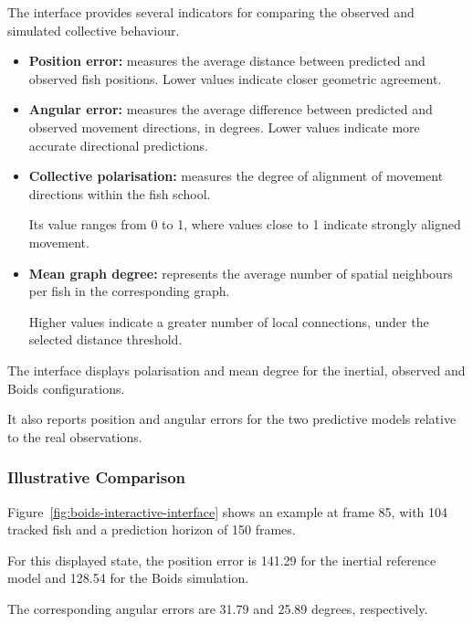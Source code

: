 \documentclass[10pt,a4paper]{article}
\begin{document}
The interface provides several indicators
for comparing the observed and simulated
collective behaviour.

\begin{itemize}

    \item \textbf{Position error:}
    measures the average distance between
    predicted and observed fish positions.
    Lower values indicate closer
    geometric agreement.

    \item \textbf{Angular error:}
    measures the average difference
    between predicted and observed
    movement directions, in degrees.
    Lower values indicate more accurate
    directional predictions.

    \item \textbf{Collective polarisation:}
    measures the degree of alignment
    of movement directions within
    the fish school.

    Its value ranges from 0 to 1,
    where values close to 1 indicate
    strongly aligned movement.

    \item \textbf{Mean graph degree:}
    represents the average number
    of spatial neighbours per fish
    in the corresponding graph.

    Higher values indicate a greater
    number of local connections,
    under the selected distance threshold.

\end{itemize}

The interface displays polarisation
and mean degree for the inertial,
observed and Boids configurations.

It also reports position and angular
errors for the two predictive models
relative to the real observations.

\subsubsection*{Illustrative Comparison}

Figure~\ref{fig:boids-interactive-interface}
shows an example at frame 85,
with 104 tracked fish and a
prediction horizon of 150 frames.

For this displayed state,
the position error is 141.29
for the inertial reference model
and 128.54 for the Boids simulation.

The corresponding angular errors
are 31.79 and 25.89 degrees,
respectively.
\end{document}

